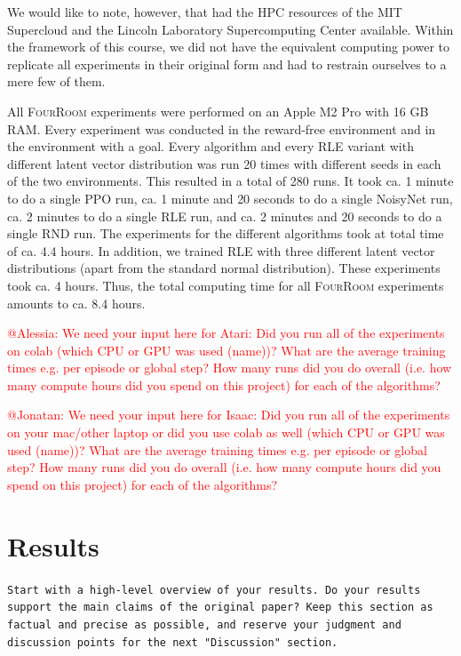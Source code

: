 \documentclass[10pt]{article} %
\begin{document}
\noindent We would like to note, however, that \cite{rle-paper} had the HPC resources of the MIT Supercloud and the Lincoln Laboratory Supercomputing Center available. Within the framework of this course, we did not have the equivalent computing power to replicate all experiments in their original form and had to restrain ourselves to a mere few of them.

All \textsc{FourRoom} experiments were performed on an Apple M2 Pro with 16 GB RAM. Every experiment was conducted in the reward-free environment and in the environment with a goal. Every algorithm and every RLE variant with different latent vector distribution was run 20 times with different seeds in each of the two environments. This resulted in a total of 280 runs. It took ca. 1 minute to do a single PPO run, ca. 1 minute and 20 seconds to do a single NoisyNet run, ca. 2 minutes to do a single RLE run, and ca. 2 minutes and 20 seconds to do a single RND run. The experiments for the different algorithms took at total time of ca. 4.4 hours. In addition, we trained RLE with three different latent vector distributions (apart from the standard normal distribution). These experiments took ca. 4 hours. Thus, the total computing time for all \textsc{FourRoom} experiments amounts to ca. 8.4 hours.

\noindent \textcolor{red}{@Alessia: We need your input here for Atari: Did you run all of the experiments on colab (which CPU or GPU was used (name))? What are the average training times e.g. per episode or global step? How many runs did you do overall (i.e. how many compute hours did you spend on this project) for each of the algorithms?}

\noindent \textcolor{red}{@Jonatan: We need your input here for Isaac: Did you run all of the experiments on your mac/other laptop or did you use colab as well (which CPU or GPU was used (name))? What are the average training times e.g. per episode or global step? How many runs did you do overall (i.e. how many compute hours did you spend on this project) for each of the algorithms?}

\hypertarget{sec4}{\section{Results}}

\noindent \texttt{Start with a high-level overview of your results. Do your results support the main claims of the original paper? Keep this section as factual and precise as possible, and reserve your judgment and discussion points for the next "Discussion" section.}
\end{document}
